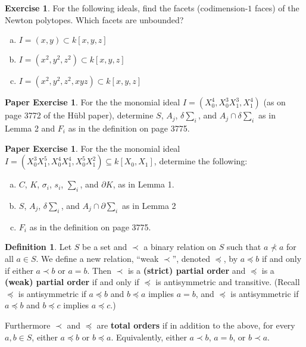\documentclass{amsart}
\theoremstyle{plain}
\theoremstyle{definition}
\newtheorem{definition}{Definition}
\newtheorem{exercise}[theorem]{Exercise}
\newtheorem{paperexercise}[theorem]{Paper Exercise}
\theoremstyle{definition}
\newcommand{\defining}[1]{\textbf{#1}}
\newcommand{\boundary}{\partial}
\begin{document}
\begin{exercise}
For the following ideals, find the facets (codimension-$1$ faces) of the Newton polytopes.
Which facets are unbounded?
\begin{enumerate}[a.]
\item $I = (x,y) \subset k[x,y,z]$
\item $I = (x^2,y^2,z^2) \subset k[x,y,z]$
\item $I = (x^2,y^2,z^2,xyz) \subset k[x,y,z]$
\end{enumerate}
\end{exercise}

\begin{paperexercise}
For the the monomial ideal $I = (X_0^4, X_0^3X_1^3, X_1^4)$
(as on page 3772 of the H\"ubl paper), determine $S$, $A_j$, $\delta \sum_i$,
and $A_j \cap \delta \sum_i$ as in Lemma 2 and $F_i$ as in the definition on page 3775.
\end{paperexercise}

\begin{paperexercise}
For the the monomial ideal
$I = (X_0^3X_1^5, X_0^4X_1^4, X_0^5X_1^2) \subseteq k[X_0, X_1]$,
determine the following:
\begin{enumerate}[a.]
\item $C$, $K$, $\sigma_i$, $s_i$, $\sum_i$, and $\boundary K$, as in Lemma 1.
\item $S$, $A_j$, $\delta \sum_i$, and $A_j \cap \boundary \sum_i$ as in Lemma 2
\item $F_i$ as in the definition on page 3775.
\end{enumerate}
\end{paperexercise}


\begin{definition}
Let $S$ be a set and $\prec$ a binary relation on $S$
such that $a \not \prec a$ for all $a \in S$.
We define a new relation, ``weak $\prec$'', denoted $\preceq$, by
$a \preceq b$ if and only if either $a \prec b$ or $a=b$.
Then $\prec$ is a \defining{(strict) partial order} and $\preceq$ is a \defining{(weak) partial order}
if and only if $\preceq$ is antisymmetric and transitive.
(Recall $\preceq$ is antisymmetric if $a \preceq b$ and $b \preceq a$ implies $a=b$,
and $\preceq$ is antisymmetric if $a \preceq b$ and $b \preceq c$ implies $a \preceq c$.)

Furthermore $\prec$ and $\preceq$ are \defining{total orders}
if in addition to the above, for every $a, b \in S$, either $a \preceq b$ or $b \preceq a$.
Equivalently, either $a \prec b$, $a=b$, or $b \prec a$.
\end{definition}
\end{document}
